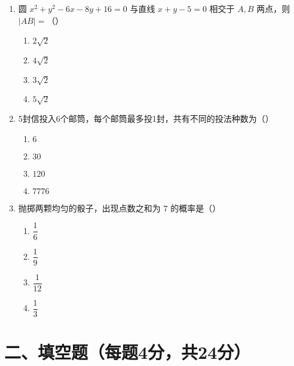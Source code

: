 \documentclass[12pt,a4paper]{ctexart}
\begin{document}
\begin{enumerate}
    \item 圆 $x^2 + y^2 - 6x - 8y + 16 = 0$ 与直线 $x + y - 5 = 0$ 相交于 $A,B$ 两点，则 $|AB|=$（）
    \begin{multicols}{2}
    \begin{enumerate}
        \item $2\sqrt{2}$
        \item $4\sqrt{2}$
        \item $3\sqrt{2}$
        \item $5\sqrt{2}$
    \end{enumerate}
    \end{multicols}

    \item 5封信投入6个邮筒，每个邮筒最多投1封，共有不同的投法种数为（）
    \begin{multicols}{2}
    \begin{enumerate}
        \item $6$
        \item $30$
        \item $120$
        \item $7776$
    \end{enumerate}
    \end{multicols}

    \item 抛掷两颗均匀的骰子，出现点数之和为 $7$ 的概率是（）
    \begin{multicols}{2}
    \begin{enumerate}
        \item $\dfrac{1}{6}$
        \item $\dfrac{1}{9}$
        \item $\dfrac{1}{12}$
        \item $\dfrac{1}{3}$
    \end{enumerate}
    \end{multicols}
\end{enumerate}

\section*{二、填空题（每题4分，共24分）}
\end{document}
